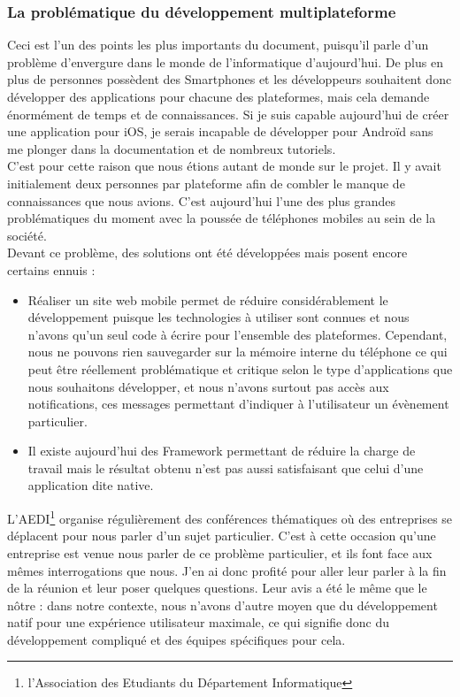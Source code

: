 \documentclass{article}
\begin{document}
\subsubsection{La problématique du développement multiplateforme}
		Ceci est l'un des points les plus importants du document, puisqu'il parle d'un problème d'envergure dans le monde de l'informatique d'aujourd'hui. De plus en plus de personnes possèdent des Smartphones et les développeurs souhaitent donc développer des applications pour chacune des plateformes, mais cela demande énormément de temps et de connaissances. Si je suis capable aujourd'hui de créer une application pour iOS, je serais incapable de développer pour Androïd sans me plonger dans la documentation et de nombreux tutoriels. \\
		
		C'est pour cette raison que nous étions autant de monde sur le projet. Il y avait initialement deux personnes par plateforme afin de combler le manque de connaissances que nous avions.  C'est aujourd'hui l'une des plus grandes problématiques du moment avec la poussée de téléphones mobiles au sein de la société. \\
		
		Devant ce problème, des solutions ont été développées mais posent encore certains ennuis : 
		\begin{itemize}
			\item Réaliser un site web mobile permet de réduire considérablement le développement puisque les technologies à utiliser sont connues et nous n'avons qu'un seul code à écrire pour l'ensemble des plateformes. Cependant, nous ne pouvons rien sauvegarder sur la mémoire interne du téléphone ce qui peut être réellement problématique et critique selon le type d'applications que nous souhaitons développer, et nous n'avons surtout pas accès aux notifications, ces messages permettant d'indiquer à l'utilisateur un évènement particulier. 
			\item Il existe aujourd'hui des Framework permettant de réduire la charge de travail mais le résultat obtenu n'est pas aussi satisfaisant que celui d'une application dite native.\\
		\end{itemize}
		
		L'AEDI\footnote{l'Association des Etudiants du Département Informatique} organise régulièrement des conférences thématiques où des entreprises se déplacent pour nous parler d'un sujet particulier. C'est à cette occasion qu'une entreprise est venue nous parler de ce problème particulier, et ils font face aux mêmes interrogations que nous. J'en ai donc profité pour aller leur parler à la fin de la réunion et leur poser quelques questions. Leur avis a été le même que le nôtre : dans notre contexte, nous n'avons d'autre moyen que du développement natif pour une expérience utilisateur maximale, ce qui signifie donc du développement compliqué et des équipes spécifiques pour cela.
		
\end{document}
